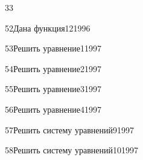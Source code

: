 \begin{TrigSourcePage}{33}
\begin{TrigExercise}{52}{Дана функция}{12}{1996}
\begin{TrigParts}
\end{TrigParts}
\end{TrigExercise}
\begin{TrigExercise}{53}{Решить уравнение}{1}{1997}
\end{TrigExercise}
\begin{TrigExercise}{54}{Решить уравнение}{2}{1997}
\end{TrigExercise}
\begin{TrigExercise}{55}{Решить уравнение}{3}{1997}
\end{TrigExercise}
\begin{TrigExercise}{56}{Решить уравнение}{4}{1997}
\end{TrigExercise}
\begin{TrigExercise}{57}{Решить систему уравнений}{9}{1997}
\end{TrigExercise}
\begin{TrigExercise}{58}{Решить систему уравнений}{10}{1997}
\end{TrigExercise}
\end{TrigSourcePage}

